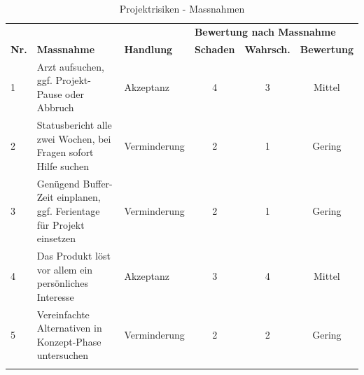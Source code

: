 \begin{longtable}[]{@{}lp{4.1cm}lccc@{}}
  \toprule
               &                                                                       &                   & \multicolumn{3}{l}{\textbf{Bewertung nach Massnahme}}\tabularnewline
  \textbf{Nr.} & \textbf{Massnahme}                                                    & \textbf{Handlung} & \textbf{Schaden}                                                     & \textbf{Wahrsch.} & \textbf{Bewertung}\tabularnewline
  \midrule
  \endhead
  1            & Arzt aufsuchen, ggf. Projekt-Pause oder Abbruch                       & Akzeptanz         & 4                                                                    & 3                 & Mittel\tabularnewline
  2            & Statusbericht alle zwei Wochen, bei Fragen sofort Hilfe suchen        & Verminderung      & 2                                                                    & 1                 & Gering\tabularnewline
  3            & Genügend Buffer-Zeit einplanen, ggf. Ferientage für Projekt einsetzen & Verminderung      & 2                                                                    & 1                 & Gering\tabularnewline
  4            & Das Produkt löst vor allem ein persönliches Interesse                 & Akzeptanz         & 3                                                                    & 4                 & Mittel\tabularnewline
  5            & Vereinfachte Alternativen in Konzept-Phase untersuchen                & Verminderung      & 2                                                                    & 2                 & Gering\tabularnewline
  \bottomrule
  \caption{Projektrisiken - Massnahmen}
\end{longtable}



